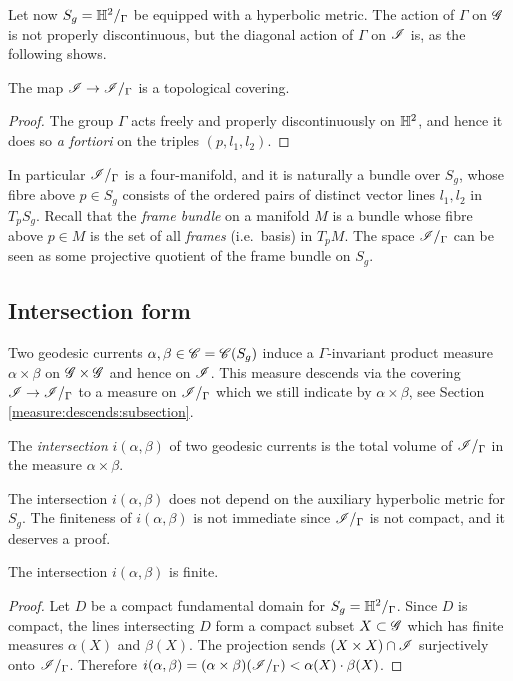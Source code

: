 Let now $S_g=\mathbb{H}^2/_\Gamma$ be equipped with a hyperbolic metric. The action of $\Gamma$ on $\mathscr{G}$ is not properly discontinuous, but the diagonal action of $\Gamma$ on $\mathscr{I}$ is, as the following shows.
\begin{prop}
The map $\mathscr{I} \to \mathscr{I}/_\Gamma$ is a topological covering.
\end{prop}
\begin{proof}
The group $\Gamma$ acts freely and properly discontinuously on $\mathbb{H}^2$, and hence it does so \emph{a fortiori} on the triples $(p,l_1,l_2)$.
\end{proof}

In particular $\mathscr{I}/_\Gamma$ is a four-manifold, and it is naturally a bundle over $S_g$, whose fibre above $p\in S_g$ consists of the ordered pairs of distinct vector lines $l_1,l_2$ in $T_pS_g$. Recall that the \emph{frame bundle} on a manifold $M$ is a bundle whose fibre above $p\in M$ is the set of all \emph{frames} (i.e.~basis) in $T_pM$. The space $\mathscr{I}/_\Gamma$ can be seen as some projective quotient of the frame bundle on $S_g$.

\subsection{Intersection form}
Two geodesic currents $\alpha, \beta \in \mathscr{C} = \mathscr{C}(S_g)$ induce a $\Gamma$-invariant product measure $\alpha\times \beta$ on $\mathscr{G}\times \mathscr{G}$ and hence on $\mathscr{I}$. This measure descends via the covering $\mathscr{I} \to \mathscr{I}/_\Gamma$ to a measure on $\mathscr{I}/_\Gamma$ which we still indicate by $\alpha\times \beta$, see Section \ref{measure:descends:subsection}.

\begin{defn}
The \emph{intersection} $i(\alpha,\beta)$ of two geodesic currents is the total volume of $\mathscr{I}/_\Gamma$ in the measure $\alpha\times\beta$. 
\end{defn}

The intersection $i(\alpha, \beta)$ does not depend on the auxiliary hyperbolic metric for $S_g$. The finiteness of $i(\alpha,\beta)$ is not immediate since $\mathscr{I}/_\Gamma$ is not compact, and it deserves a proof.

\begin{prop}
The intersection $i(\alpha,\beta)$ is finite.
\end{prop}
\begin{proof}
Let $D$ be a compact fundamental domain for $S_g = \mathbb{H}^2/_\Gamma$. Since $D$ is compact, the lines intersecting $D$ form a compact subset $X\subset \mathscr{G}$ which has finite measures $\alpha(X)$ and $\beta(X)$. The projection sends $(X \times X) \cap \mathscr{I}$ surjectively onto $\mathscr{I}/_\Gamma$. 
Therefore $i(\alpha,\beta) = (\alpha\times \beta) (\mathscr{I}/_\Gamma) < \alpha(X) \cdot \beta(X)$.
\end{proof}

